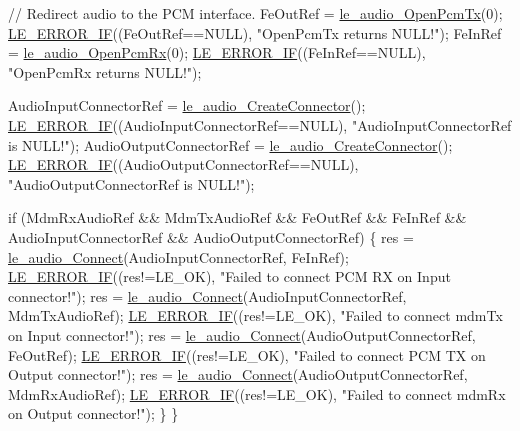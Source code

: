 \begin{DoxyCodeInclude}
{{{{{{{{{    \textcolor{comment}{// Redirect audio to the PCM interface.}
    FeOutRef = \hyperlink{le__audio__interface_8h_a5e112543e8525775aa670dc71b320766}{le\_audio\_OpenPcmTx}(0);
    \hyperlink{le__log_8h_aceaf11a11691d6c676e36dd317b38dbd}{LE\_ERROR\_IF}((FeOutRef==NULL), \textcolor{stringliteral}{"OpenPcmTx returns NULL!"});
    FeInRef = \hyperlink{le__audio__interface_8h_aa0f0b5fcab8844c67a936d88fa050cf5}{le\_audio\_OpenPcmRx}(0);
    \hyperlink{le__log_8h_aceaf11a11691d6c676e36dd317b38dbd}{LE\_ERROR\_IF}((FeInRef==NULL), \textcolor{stringliteral}{"OpenPcmRx returns NULL!"});

    AudioInputConnectorRef = \hyperlink{le__audio__interface_8h_a570aaf85086f00aca592acfbaaa237be}{le\_audio\_CreateConnector}();
    \hyperlink{le__log_8h_aceaf11a11691d6c676e36dd317b38dbd}{LE\_ERROR\_IF}((AudioInputConnectorRef==NULL), \textcolor{stringliteral}{"AudioInputConnectorRef is NULL!"});
    AudioOutputConnectorRef = \hyperlink{le__audio__interface_8h_a570aaf85086f00aca592acfbaaa237be}{le\_audio\_CreateConnector}();
    \hyperlink{le__log_8h_aceaf11a11691d6c676e36dd317b38dbd}{LE\_ERROR\_IF}((AudioOutputConnectorRef==NULL), \textcolor{stringliteral}{"AudioOutputConnectorRef is NULL!"});

    \textcolor{keywordflow}{if} (MdmRxAudioRef && MdmTxAudioRef && FeOutRef && FeInRef &&
        AudioInputConnectorRef && AudioOutputConnectorRef)
    \{
        res = \hyperlink{le__audio__interface_8h_a338df65b2fb1ae0140d86880adbcf0de}{le\_audio\_Connect}(AudioInputConnectorRef, FeInRef);
        \hyperlink{le__log_8h_aceaf11a11691d6c676e36dd317b38dbd}{LE\_ERROR\_IF}((res!=LE\_OK), \textcolor{stringliteral}{"Failed to connect PCM RX on Input connector!"});
        res = \hyperlink{le__audio__interface_8h_a338df65b2fb1ae0140d86880adbcf0de}{le\_audio\_Connect}(AudioInputConnectorRef, MdmTxAudioRef);
        \hyperlink{le__log_8h_aceaf11a11691d6c676e36dd317b38dbd}{LE\_ERROR\_IF}((res!=LE\_OK), \textcolor{stringliteral}{"Failed to connect mdmTx on Input connector!"});
        res = \hyperlink{le__audio__interface_8h_a338df65b2fb1ae0140d86880adbcf0de}{le\_audio\_Connect}(AudioOutputConnectorRef, FeOutRef);
        \hyperlink{le__log_8h_aceaf11a11691d6c676e36dd317b38dbd}{LE\_ERROR\_IF}((res!=LE\_OK), \textcolor{stringliteral}{"Failed to connect PCM TX on Output connector!"});
        res = \hyperlink{le__audio__interface_8h_a338df65b2fb1ae0140d86880adbcf0de}{le\_audio\_Connect}(AudioOutputConnectorRef, MdmRxAudioRef);
        \hyperlink{le__log_8h_aceaf11a11691d6c676e36dd317b38dbd}{LE\_ERROR\_IF}((res!=LE\_OK), \textcolor{stringliteral}{"Failed to connect mdmRx on Output connector!"});
    \}
\}

}}}}}}}}}
\end{DoxyCodeInclude}
